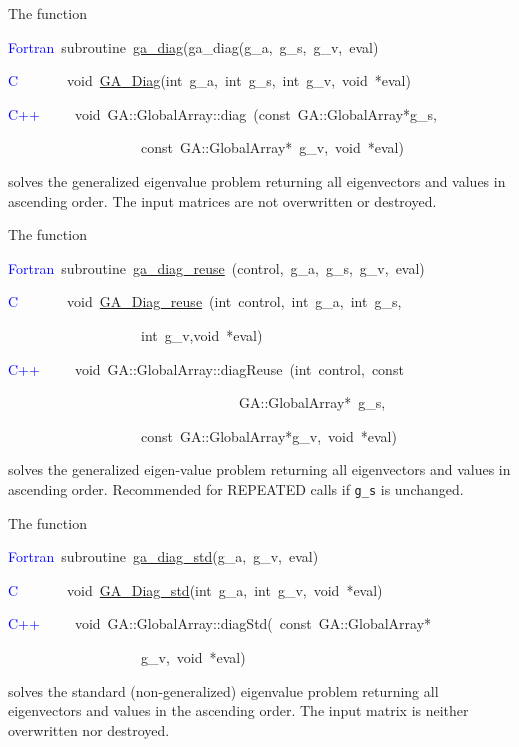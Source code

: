 The function
\begin{lyxcode}
\textcolor{blue}{Fortran}~subroutine~\href{http://www.emsl.pnl.gov/docs/global/ga_ops.html\#ga_diag}{ga\_{}diag}(ga\_diag(g\_a,~g\_s,~g\_v,~eval)~

\textcolor{blue}{C}~~~~~~~void~\href{http://www.emsl.pnl.gov/docs/global/c_nga_ops.html\#ga_diag}{GA\_{}Diag}(int~g\_a,~int~g\_s,~int~g\_v,~void~{*}eval)

\textcolor{blue}{C++}~~~~~void~GA::GlobalArray::diag~(const~GA::GlobalArray{*}g\_s,~

~~~~~~~~~~~~~~~~~~~const~GA::GlobalArray{*}~g\_v,~void~{*}eval)
\end{lyxcode}
solves the generalized eigenvalue problem returning all eigenvectors
and values in ascending order. The input matrices are not overwritten
or destroyed.

The function
\begin{lyxcode}
\textcolor{blue}{Fortran}~subroutine~\href{http://www.emsl.pnl.gov/docs/global/ga_ops.html\#ga_diag_reuse}{ga\_{}diag\_{}reuse}~(control,~g\_a,~g\_s,~g\_v,~eval)~

\textcolor{blue}{C}~~~~~~~void~\href{http://www.emsl.pnl.gov/docs/global/c_nga_ops.html\#ga_diag_reuse}{GA\_{}Diag\_{}reuse}~(int~control,~int~g\_a,~int~g\_s,

~~~~~~~~~~~~~~~~~~~int~g\_v,void~{*}eval)~

\textcolor{blue}{C++}~~~~~void~GA::GlobalArray::diagReuse~(int~control,~const

~~~~~~~~~~~~~~~~~~~~~~~~~~~~~~~~~GA::GlobalArray{*}~g\_s,~~~~~

~~~~~~~~~~~~~~~~~~~const~GA::GlobalArray{*}g\_v,~void~{*}eval)
\end{lyxcode}
solves the generalized eigen-value problem returning all eigenvectors
and values in ascending order. Recommended for REPEATED calls if \texttt{g\_s}
is unchanged.

The function
\begin{lyxcode}
\textcolor{blue}{Fortran}~subroutine~\href{http://www.emsl.pnl.gov/docs/global/ga_ops.html\#ga_diag_std}{ga\_{}diag\_{}std}(g\_a,~g\_v,~eval)~

\textcolor{blue}{C}~~~~~~~void~\href{http://www.emsl.pnl.gov/docs/global/c_nga_ops.html\#ga_diag_std}{GA\_{}Diag\_{}std}(int~g\_a,~int~g\_v,~void~{*}eval)

\textcolor{blue}{C++}~~~~~void~GA::GlobalArray::diagStd(~const~GA::GlobalArray{*}~

~~~~~~~~~~~~~~~~~~~g\_v,~void~{*}eval)
\end{lyxcode}
solves the standard (non-generalized) eigenvalue problem returning
all eigenvectors and values in the ascending order. The input matrix
is neither overwritten nor destroyed. 



